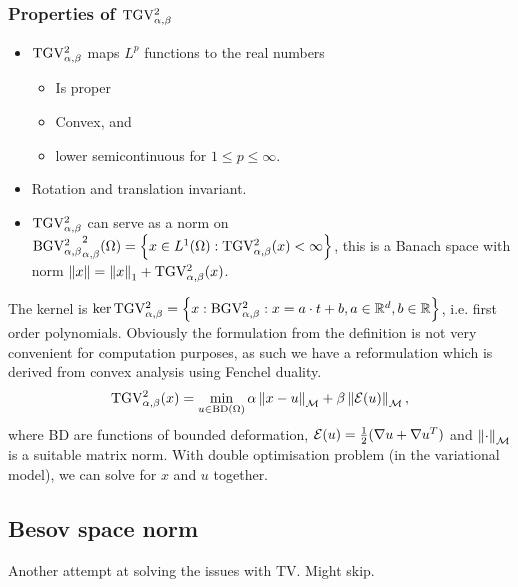 \documentclass[12pt]{article}
\begin{document}
\subsubsection{Properties of $\operatorname{TGV^2_{\alpha,\beta}}$}
\begin{itemize}
    \item $\operatorname{TGV^2_{\alpha,\beta}}$ maps $L^p$ functions to the real numbers
    \begin{itemize}
        \item Is proper
        \item Convex, and
        \item lower semicontinuous for $1\leq p\leq \infty$.
    \end{itemize}
    \item Rotation and translation invariant.
    \item $\operatorname{TGV^2_{\alpha,\beta}}$ can serve as a norm on $\operatorname{BGV^2_{\alpha,\beta}}^2_{\alpha,\beta}(\Omega) = \left\{x\in L^1(\Omega): \operatorname{TGV^2_{\alpha,\beta}}(x)<\infty\right\}$, this is a Banach space with norm $\left\lVert x\right\rVert = \left\lVert x\right\rVert_1+\operatorname{TGV^2_{\alpha,\beta}}(x)$.
\end{itemize}

The kernel is $\ker \operatorname{TGV^2_{\alpha,\beta}} = \left\{x:\operatorname{BGV^2_{\alpha,\beta}} : x=a\cdot t+b, a\in \mathbb{R}^d, b\in\mathbb{R}\right\}$, i.e. first order polynomials. Obviously the formulation from the definition is not very convenient for computation purposes, as such we have a reformulation which is derived from convex analysis using Fenchel duality.
\begin{equation*}
    \operatorname{TGV^2_{\alpha,\beta}}(x) = \min_{u\in\text{BD}(\Omega)} \alpha\left\lVert x-u\right\rVert_\mathcal{M} + \beta \left\lVert\mathcal{E}(u)\right\rVert_\mathcal{M},
\end{equation*} 
where BD are functions of bounded deformation, $\mathcal{E}(u)=\frac{1}{2}(\nabla u + \nabla u^T)$ and $\left\lVert\cdot\right\rVert_\mathcal{M}$ is a suitable matrix norm. With double optimisation problem (in the variational model), we can solve for $x$ and $u$ together.

\subsection{Besov space norm}
Another attempt at solving the issues with TV. Might skip.
\end{document}
